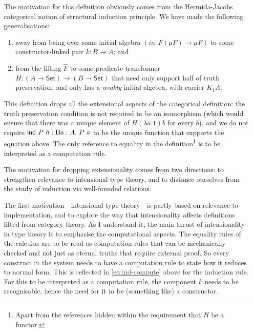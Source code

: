 \documentclass{article}
\newcommand{\Set}{\mathsf{Set}}
\newcommand{\inn}{\mathit{in}}
\begin{document}
The motivation for this definition obviously comes from the
Hermida-Jacobs categorical notion of structural induction principle.
We have made the following generalisations:
\begin{enumerate}
\item away from being over some initial algebra $(\inn : F (\mu F) \to
  \mu F)$ to some constructor-linked pair $k : B \to A$; and
\item from the lifting $\hat{F}$ to some predicate transformer $H : (A
  \to \Set) \to (B \to \Set)$ that need only support half of truth
  preservation, and only has a \emph{weakly} initial algebra, with
  carrier $K_1 A$.
\end{enumerate}
This definition drops all the extensional aspects of the categorical
definition: the truth preservation condition is not required to be an
isomorphism (which would ensure that there was a unique element of
$H(\lambda a. 1)b$ for every $b$), and we do not require $\mathsf{ind}\ P\ h :
\Pi a : A.\ P\ a$ to be the unique function that supports the equation
above. The only reference to equality in the definition\footnote{Apart
  from the references hidden within the requirement that $H$ be a
  functor.} is to be interpreted as a computation rule.

The motivation for dropping extensionality comes from two directions:
to strengthen relevance to intensional type theory, and to distance
ourselves from the study of induction via well-founded relations.

The first motivation---intensional type theory---is partly based on
relevance to implementation, and to explore the way that
intensionality affects definitions lifted from category theory. As I
understand it, the main thrust of intensionality in type theory is to
emphasise the computational aspects. The equality rules of the
calculus are to be read as computation rules that can be mechanically
checked and not just as eternal truths that require external proof. So
every construct in the system needs to have a computation rule to
state how it reduces to normal form. This is reflected in
\autoref{eq:ind-compute} above for the induction rule. For this to be
interpreted as a computation rule, the component $k$ needs to be
recognisable, hence the need for it to be (something like) a
constructor.
\end{document}
